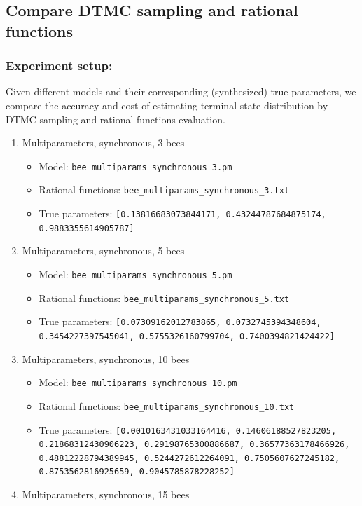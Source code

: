 \documentclass[12pt]{article}
\theoremstyle{definition}
\begin{document}
\subsection{Compare DTMC sampling and rational functions}
\subsubsection{Experiment setup:}
Given different models and their corresponding (synthesized) true parameters, we
compare the accuracy and cost of estimating terminal state distribution by DTMC
sampling and rational functions evaluation.
\begin{enumerate}
\item Multiparameters, synchronous, 3 bees
  \begin{itemize}
  \item Model: \texttt{bee\_multiparams\_synchronous\_3.pm}
  \item Rational functions: \texttt{bee\_multiparams\_synchronous\_3.txt}
  \item True parameters: \texttt{[0.13816683073844171, 0.43244787684875174, 0.9883355614905787]} 
  \end{itemize}
\item Multiparameters, synchronous, 5 bees
  \begin{itemize}
  \item Model: \texttt{bee\_multiparams\_synchronous\_5.pm}
  \item Rational functions: \texttt{bee\_multiparams\_synchronous\_5.txt}
  \item True parameters: \texttt{[0.07309162012783865, 0.0732745394348604,
      0.3454227397545041, 0.5755326160799704, 0.7400394821424422]}
  \end{itemize}
\item Multiparameters, synchronous, 10 bees
  \begin{itemize}
  \item Model: \texttt{bee\_multiparams\_synchronous\_10.pm}
  \item Rational functions: \texttt{bee\_multiparams\_synchronous\_10.txt}
  \item True parameters: \texttt{[0.0010163431033164416, 0.14606188527823205,
      0.21868312430906223, 0.29198765300886687, 0.36577363178466926,
      0.48812228794389945, 0.5244272612264091, 0.7505607627245182,
      0.8753562816925659, 0.9045785878228252] }
  \end{itemize}
\item Multiparameters, synchronous, 15 bees

\end{enumerate}
\end{document}
